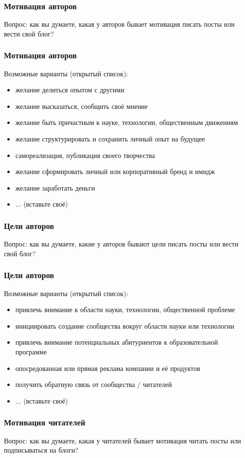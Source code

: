 \documentclass[12pt]{beamer}
\begin{document}
\begin{frame}
  \frametitle{Мотивация авторов}
  Вопрос: как вы думаете, какая у авторов бывает мотивация писать посты или вести свой блог?
\end{frame}

\begin{frame}
  \frametitle{Мотивация авторов}
  Возможные варианты (открытый список):
  \begin{itemize}
  \item желание делиться опытом с другими
  \item желание высказаться, сообщить своё мнение
  \item желание быть причастным к науке, технологии, общественным движениям
  \item желание структурировать и сохранить личный опыт на будущее
  \item самореализация, публикация своего творчества
  \item желание сформировать личный или корпоративный бренд и имидж
  \item желание заработать деньги
  \item ... (вставьте своё)
  \end{itemize}
\end{frame}

\begin{frame}
  \frametitle{Цели авторов}
  Вопрос: как вы думаете, какие у авторов бывают цели писать посты или вести свой блог?
\end{frame}

\begin{frame}
  \frametitle{Цели авторов}
  Возможные варианты (открытый список):
  \begin{itemize}
  \item привлечь внимание к области науки, технологии, общественной проблеме
  \item инициировать создание сообщества вокруг области науки или технологии
  \item привлечь внимание потенциальных абитуриентов к образовательной программе
  \item опосредованная или прямая реклама компании и её продуктов
  \item получить обратную связь от сообщества / читателей
  \item ... (вставьте своё)
  \end{itemize}
\end{frame}

\begin{frame}
  \frametitle{Мотивация читателей}
  Вопрос: как вы думаете, какая у читателей бывает мотивация читать посты
  или подписываться на блоги?
\end{frame}
\end{document}
